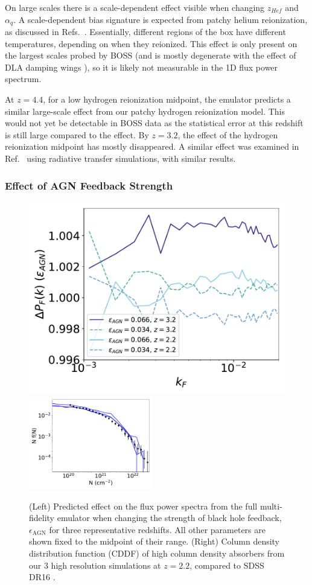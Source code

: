 \documentclass[a4paper,11pt]{article}
\begin{document}
On large scales there is a scale-dependent effect visible when changing $z_{Hef}$ and $\alpha_q$. A scale-dependent bias signature is expected from patchy helium reionization, as discussed in Refs.~\cite{Pontzen:2014a, Pontzen:2014b,  Gontcho:2014}. Essentially, different regions of the box have different temperatures, depending on when they reionized. This effect is only present on the largest scales probed by BOSS (and is mostly degenerate with the effect of DLA damping wings \cite{Rogers:2017}), so it is likely not measurable in the 1D flux power spectrum. %

At $z=4.4$, for a low hydrogen reionization midpoint, the emulator predicts a similar large-scale effect from our patchy hydrogen reionization model. This would not yet be detectable in BOSS data as the statistical error at this redshift is still large compared to the effect. By $z=3.2$, the effect of the hydrogen reionization midpoint has mostly disappeared. A similar effect was examined in Ref.~\cite{Molaro:2022} using radiative transfer simulations, with similar results.

\subsubsection{Effect of AGN Feedback Strength}
\label{sec:agnresult}

\begin{figure}
\centering
\includegraphics[width=0.48\columnwidth]{figures/single_param_bhfeedback.pdf}
\includegraphics[width=0.48\textwidth]{figures/cddf_hires.pdf}
 \caption{(Left) Predicted effect on the flux power spectra from the full multi-fidelity emulator when changing the strength of black hole feedback, $\epsilon_\mathrm{AGN}$ for three representative redshifts. All other parameters are shown fixed to the midpoint of their range. (Right) Column density distribution function (CDDF) of high column density absorbers from our $3$ high resolution simulations at $z=2.2$, compared to SDSS DR16 \cite{2021MNRAS.507..704H}.}
 \label{fig:DLACDDF}
\end{figure}
\end{document}
